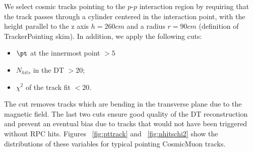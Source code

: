 We select cosmic tracks pointing to the $p$-$p$ interaction
region by requiring that the track passes through a cylinder 
centered in the interaction point, with the height parallel 
to the z axis $h = 260 cm$ and a radius $r = 90 cm$ 
(definition of TrackerPointing skim). In addition, we apply the following 
cuts:
\begin{itemize}
\item
$\pt$ at the innermost point $ > 5$\GeVc 
\item
$N_{hits}$ in the DT $ > 20 $;
\item
$\chi^2$ of the track fit $ < 20 $.
\end{itemize}
The \pt cut removes tracks which are
bending in the transverse plane due 
to the magnetic field. The last two cuts 
ensure good quality of the DT reconstruction 
and prevent an eventual bias due to 
tracks that would not have been triggered 
without RPC hits.
Figures ~\ref{fig:pttrack} and ~\ref{fig:nhitschi2} show 
the distributions of these variables for typical pointing
CosmicMuon tracks.

